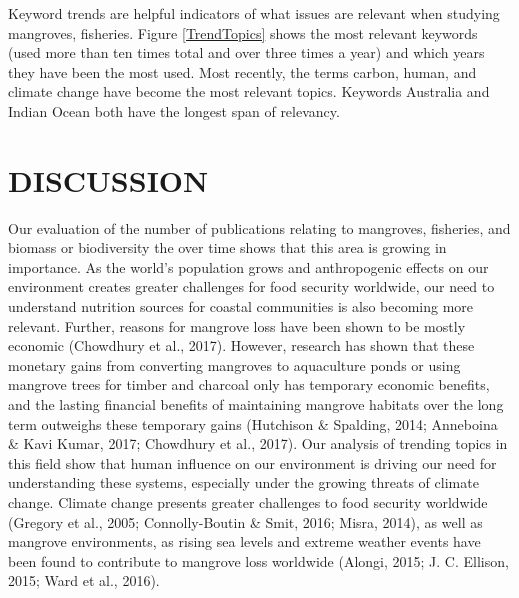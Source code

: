 \documentclass[
  12pt,
]{article}
\begin{document}
Keyword trends are helpful indicators of what issues are relevant when studying mangroves, fisheries. Figure \ref{TrendTopics} shows the most relevant keywords (used more than ten times total and over three times a year) and which years they have been the most used. Most recently, the terms carbon, human, and climate change have become the most relevant topics. Keywords Australia and Indian Ocean both have the longest span of relevancy.

\hypertarget{discussion}{%
\section{DISCUSSION}\label{discussion}}

Our evaluation of the number of publications relating to mangroves, fisheries, and biomass or biodiversity the over time shows that this area is growing in importance. As the world's population grows and anthropogenic effects on our environment creates greater challenges for food security worldwide, our need to understand nutrition sources for coastal communities is also becoming more relevant. Further, reasons for mangrove loss have been shown to be mostly economic (Chowdhury et al., 2017). However, research has shown that these monetary gains from converting mangroves to aquaculture ponds or using mangrove trees for timber and charcoal only has temporary economic benefits, and the lasting financial benefits of maintaining mangrove habitats over the long term outweighs these temporary gains (Hutchison \& Spalding, 2014; Anneboina \& Kavi Kumar, 2017; Chowdhury et al., 2017). Our analysis of trending topics in this field show that human influence on our environment is driving our need for understanding these systems, especially under the growing threats of climate change. Climate change presents greater challenges to food security worldwide (Gregory et al., 2005; Connolly-Boutin \& Smit, 2016; Misra, 2014), as well as mangrove environments, as rising sea levels and extreme weather events have been found to contribute to mangrove loss worldwide (Alongi, 2015; J. C. Ellison, 2015; Ward et al., 2016).
\end{document}
